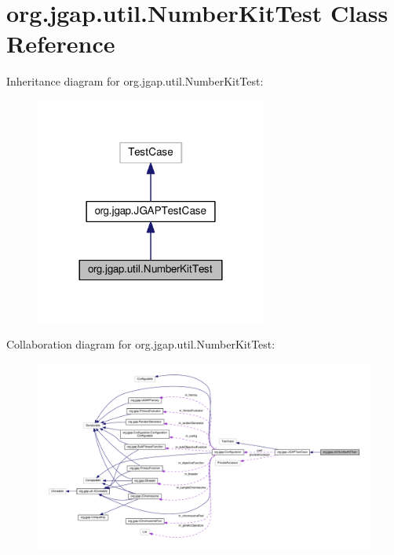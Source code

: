 \hypertarget{classorg_1_1jgap_1_1util_1_1_number_kit_test}{\section{org.\-jgap.\-util.\-Number\-Kit\-Test Class Reference}
\label{classorg_1_1jgap_1_1util_1_1_number_kit_test}
}


Inheritance diagram for org.\-jgap.\-util.\-Number\-Kit\-Test\-:
\nopagebreak
\begin{figure}[H]
\begin{center}
\leavevmode
\includegraphics[width=216pt]{classorg_1_1jgap_1_1util_1_1_number_kit_test__inherit__graph}
\end{center}
\end{figure}


Collaboration diagram for org.\-jgap.\-util.\-Number\-Kit\-Test\-:
\nopagebreak
\begin{figure}[H]
\begin{center}
\leavevmode
\includegraphics[width=350pt]{classorg_1_1jgap_1_1util_1_1_number_kit_test__coll__graph}
\end{center}
\end{figure}
